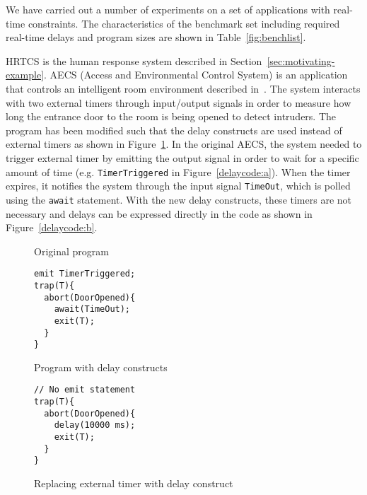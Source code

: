 We have carried out a number of experiments on a set of applications
with real-time constraints. The characteristics of the benchmark set
including required real-time delays and program sizes are shown in
Table~\ref{fig:benchlist}.


HRTCS is the human response system described in
Section~\ref{sec:motivating-example}. AECS (Access and Environmental
Control System) is an application that controls an intelligent room
environment described in~\cite{aecs_ispa}. The system interacts with two
external timers through input/output signals in order to measure how
long the entrance door to the room is being opened to detect intruders.
The program has been modified such that the delay constructs are used
instead of external timers as shown in Figure~\ref{delaycode}. In the
original AECS, the system needed to trigger external timer by emitting
the output signal in order to wait for a specific amount of time (e.g.
\texttt{TimerTriggered} in Figure~\ref{delaycode:a}). When the timer
expires, it notifies the system through the input signal
\texttt{TimeOut}, which is polled using the \texttt{await}
statement. With the new delay constructs, these timers are not necessary
and delays can be expressed directly in the code as shown in
Figure~\ref{delaycode:b}.

\begin{figure}[h!]
  \begin{SubFloat}{\label{delaycode:a}Original program}
    \centering
    \begin{minipage}[b]{0.3\linewidth}
      \scriptsize
\begin{verbatim}
emit TimerTriggered;
trap(T){
  abort(DoorOpened){
    await(TimeOut);
    exit(T); 
  }
}
\end{verbatim}
    \end{minipage}
  \end{SubFloat}
  \hspace{1cm}%
  \begin{SubFloat}{\label{delaycode:b}Program with delay constructs}
    \centering
    \begin{minipage}[b]{0.5\linewidth}
      \scriptsize
\begin{verbatim}
// No emit statement
trap(T){
  abort(DoorOpened){
    delay(10000 ms);
    exit(T);  
  }
}
\end{verbatim}
		\end{minipage}
	\end{SubFloat}
\caption{Replacing external timer with delay construct}
\label{delaycode}
\end{figure}


